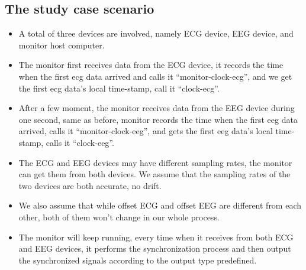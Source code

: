\documentclass[11pt, oneside]{article}   	%
\begin{document}
\subsection{The study case scenario}
\begin{itemize}
\item A total of three devices are involved, namely ECG device, EEG device, and monitor host computer. 
\item The monitor first receives data from the ECG device, it records the time when the first ecg data arrived and calls it “monitor-clock-ecg”, and we get the first ecg data’s local time-stamp, call it “clock-ecg”.
\item After a few moment, the monitor receives data from the EEG device during one second, same as before, monitor records the time when the first eeg data arrived, calls it “monitor-clock-eeg”, and gets the first eeg data’s local time-stamp, calls it “clock-eeg”.
\item The ECG and EEG devices may have different sampling rates, the monitor can get them from both devices. We assume that the sampling rates of the two devices are both accurate, no drift.
\item We also assume that while offset ECG and offset EEG are different from each other, both of them won’t change in our whole process.
\item The monitor will keep running, every time when it receives from both ECG and EEG devices, it performs the synchronization process and then output the synchronized signals according to the output type predefined.
\end{itemize}
\end{document}
